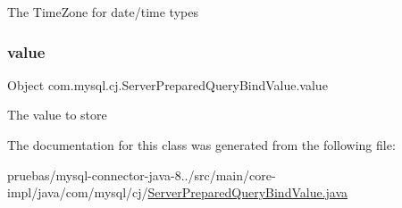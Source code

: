 The Time\+Zone for date/time types \mbox{\label{classcom_1_1mysql_1_1cj_1_1_server_prepared_query_bind_value_aa595f7da76ae912b08b89998edc62018}} 
\subsubsection{\texorpdfstring{value}{value}}
{\footnotesize\ttfamily Object com.\+mysql.\+cj.\+Server\+Prepared\+Query\+Bind\+Value.\+value}

The value to store 

The documentation for this class was generated from the following file\+:\begin{DoxyCompactItemize}
\item 
pruebas/mysql-\/connector-\/java-\/8../src/main/core-\/impl/java/com/mysql/cj/\mbox{\hyperlink{_server_prepared_query_bind_value_8java}{Server\+Prepared\+Query\+Bind\+Value.\+java}}\end{DoxyCompactItemize}
